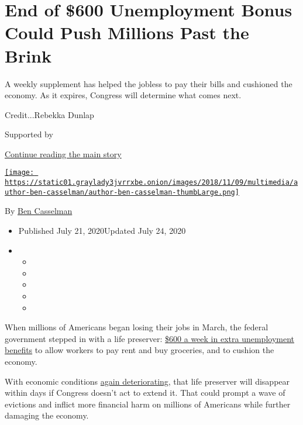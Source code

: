 \hypertarget{end-of-600-unemployment-bonus-could-push-millions-past-the-brink}{%
\section{End of \$600 Unemployment Bonus Could Push Millions Past the
Brink}\label{end-of-600-unemployment-bonus-could-push-millions-past-the-brink}}

A weekly supplement has helped the jobless to pay their bills and
cushioned the economy. As it expires, Congress will determine what comes
next.

Credit...Rebekka Dunlap

Supported by

\protect\hyperlink{after-sponsor}{Continue reading the main story}

\href{https://www.nytimes3xbfgragh.onion/by/ben-casselman}{\texttt{[image: https://static01.graylady3jvrrxbe.onion/images/2018/11/09/multimedia/author-ben-casselman/author-ben-casselman-thumbLarge.png]}}

By \href{https://www.nytimes3xbfgragh.onion/by/ben-casselman}{Ben
Casselman}

\begin{itemize}
\item
  Published July 21, 2020Updated July 24, 2020
\item
  \begin{itemize}
  \item
  \item
  \item
  \item
  \item
  \end{itemize}
\end{itemize}

When millions of Americans began losing their jobs in March, the federal
government stepped in with a life preserver:
\href{https://www.nytimes3xbfgragh.onion/2020/07/30/business/unemployment-payments-change.html}{\$600
a week in extra unemployment benefits} to allow workers to pay rent and
buy groceries, and to cushion the economy.

With economic conditions
\href{https://www.nytimes3xbfgragh.onion/2020/07/15/business/economy/economic-recovery-coronavirus-resurgence.html}{again
deteriorating}, that life preserver will disappear within days if
Congress doesn't act to extend it. That could prompt a wave of evictions
and inflict more financial harm on millions of Americans while further
damaging the economy.

